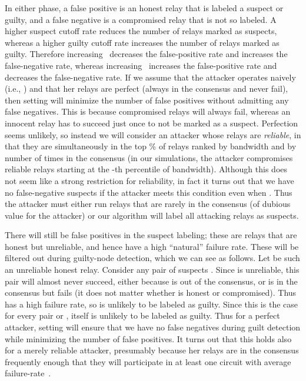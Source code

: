 \documentclass[]{lmcs}
\begin{document}
In either phase, a
false positive is an honest relay that is labeled a suspect or
guilty, and a false negative is a compromised relay that is not so labeled.
A higher suspect cutoff rate reduces the number of relays
marked as suspects, whereas a higher guilty cutoff rate increases the
number of relays marked as guilty.  Therefore increasing~
decreases the false-positive rate and increases the false-negative rate,
whereas increasing~ increases the false-positive rate and
decreases the false-negative rate.
If we assume that the attacker operates naively
(i.e., ) and that her relays are
perfect (always in the consensus and never fail), then setting
 will minimize the number of false positives without
admitting any false negatives.
This is because compromised relays will always fail,
whereas an innocent relay has to succeed just once to not be marked
as a suspect.  
Perfection seems unlikely, so instead we will consider an attacker
whose relays are \emph{reliable}, in that they are
simultaneously in the top \% of relays
ranked by bandwidth and by number of times in the consensus (in our
simulations, the attacker
compromises reliable relays starting at the -th percentile of
bandwidth).  Although this
does not seem like a strong restriction for reliability, in fact it turns
out that we have no false-negative suspects if the attacker meets this
condition even when .
Thus the attacker must either run relays that are rarely
in the consensus (of dubious value for the attacker) or our algorithm will
label all attacking relays as suspects.  

There will still be false positives in the suspect labeling;
these are relays that are honest but unreliable, and hence have a
high ``natural'' failure rate.  These will be filtered out
during guilty-node detection, which we can see as follows.  Let 
be such an unreliable honest relay.  Consider any pair of suspects
.  Since  is unreliable, this pair will almost never
succeed, either because  is out of the consensus, or  is in the consensus
but fails (it does not matter whether  is honest or compromised).
Thus  has a high failure rate, so is unlikely to be labeled
as guilty.  Since this is the case for every pair  or ,
 itself is unlikely to be labeled as guilty.  Thus for a perfect
attacker, setting
 will ensure that we have no false negatives during guilt
detection while
minimizing the number of false positives.  It turns out that
this holds also for a merely reliable attacker, presumably because
her relays are in the consensus frequently enough that they will participate
in at least one circuit with average failure-rate~.
\end{document}
